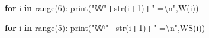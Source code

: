 \documentclass[
  a4paper,
  numbers=noendperiod,
  DIV=12]{scrreprt}
\newenvironment{Shaded}{\begin{snugshade}}{\end{snugshade}}
\newcommand{\BuiltInTok}[1]{#1}
\newcommand{\CharTok}[1]{\textcolor[rgb]{0.31,0.60,0.02}{#1}}
\newcommand{\ControlFlowTok}[1]{\textcolor[rgb]{0.13,0.29,0.53}{\textbf{#1}}}
\newcommand{\DecValTok}[1]{\textcolor[rgb]{0.00,0.00,0.81}{#1}}
\newcommand{\KeywordTok}[1]{\textcolor[rgb]{0.13,0.29,0.53}{\textbf{#1}}}
\newcommand{\NormalTok}[1]{#1}
\newcommand{\OperatorTok}[1]{\textcolor[rgb]{0.81,0.36,0.00}{\textbf{#1}}}
\newcommand{\StringTok}[1]{\textcolor[rgb]{0.31,0.60,0.02}{#1}}
\begin{document}
\begin{Shaded}
\begin{Highlighting}[]
\ControlFlowTok{for}\NormalTok{ i }\KeywordTok{in} \BuiltInTok{range}\NormalTok{(}\DecValTok{6}\NormalTok{):}
    \BuiltInTok{print}\NormalTok{(}\StringTok{"𝕎"}\OperatorTok{+}\BuiltInTok{str}\NormalTok{(i}\OperatorTok{+}\DecValTok{1}\NormalTok{)}\OperatorTok{+}\StringTok{" =}\CharTok{\textbackslash{}n}\StringTok{"}\NormalTok{,W(i))}

\ControlFlowTok{for}\NormalTok{ i }\KeywordTok{in} \BuiltInTok{range}\NormalTok{(}\DecValTok{5}\NormalTok{):}
    \BuiltInTok{print}\NormalTok{(}\StringTok{"𝕎ˢ"}\OperatorTok{+}\BuiltInTok{str}\NormalTok{(i}\OperatorTok{+}\DecValTok{1}\NormalTok{)}\OperatorTok{+}\StringTok{" =}\CharTok{\textbackslash{}n}\StringTok{"}\NormalTok{,WS(i))}
\end{Highlighting}
\end{Shaded}
\end{document}
